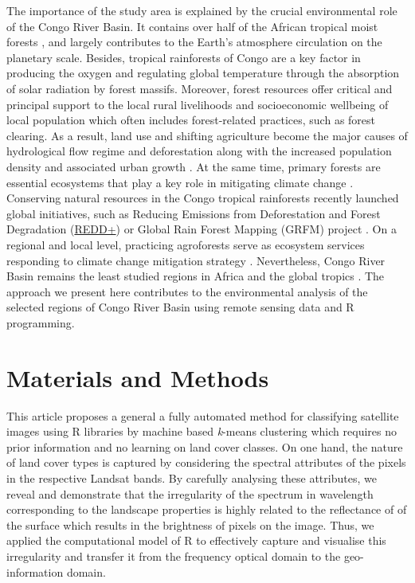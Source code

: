 \documentclass[applsci,article,submit,pdftex,moreauthors]{Definitions/mdpi}
\begin{document}
The importance of the study area is explained by the crucial environmental role of the Congo River Basin. It contains over half of the African tropical moist forests \cite{Sayer1992}, and largely contributes to the Earth's atmosphere circulation on the planetary scale. Besides, tropical rainforests of Congo are a key factor in producing the oxygen and regulating global temperature through the absorption of solar radiation by forest massifs. Moreover, forest resources offer critical and principal support to the local rural livelihoods and socioeconomic wellbeing of local population \cite{f13010130} which often includes forest-related practices, such as forest clearing. As a result, land use and shifting agriculture become the major causes of hydrological flow regime \cite{4780136} and deforestation along with the increased population density and associated urban growth \cite{Wilkie1994}. At the same time, primary forests are essential ecosystems that play a key role in mitigating climate change \cite{SOMORIN2012288,BELE20151}. Conserving natural resources in the Congo tropical rainforests recently launched global initiatives, such as Reducing Emissions from Deforestation and Forest Degradation (\href{https://www.fao.org/redd/overview/en/}{REDD+}) \cite{land11060918,SUFOKANKEU2020102081} or Global Rain Forest Mapping (GRFM) project \cite{1025720}. On a regional and local level, practicing agroforests serve as ecosystem services responding to climate change mitigation strategy \cite{Batsietal2021}. Nevertheless, Congo River Basin remains the least studied regions in Africa and the global tropics \cite{Washingtonetal2006}. The approach we present here contributes to the environmental analysis of the selected regions of Congo River Basin using remote sensing data and R programming.
 

\section{Materials and Methods}

This article proposes a general a fully automated method for classifying satellite images using R libraries by machine based \emph{k}-means clustering which requires no prior information and no learning on land cover classes. On one hand, the nature of land cover types is captured by considering the spectral attributes of the pixels in the respective Landsat bands. By carefully analysing these attributes, we reveal and demonstrate that the irregularity of the spectrum in wavelength corresponding to the landscape properties is highly related to the reflectance of of the surface which results in the brightness of pixels on the image. Thus, we applied the computational model of R to effectively capture and visualise this irregularity and transfer it from the frequency optical domain to the geo-information domain.   
\end{document}
